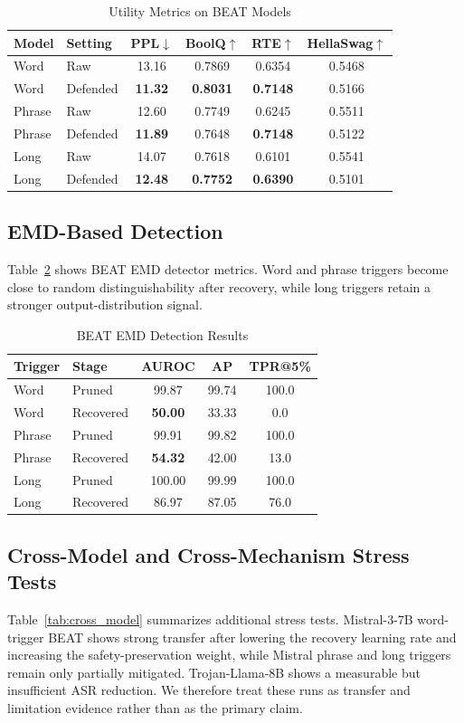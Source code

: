 \documentclass[lettersize,journal]{IEEEtran}
\begin{document}
\begin{table}[!t]
\caption{Utility Metrics on BEAT Models}
\label{tab:utility}
\centering
\begin{tabular}{llcccc}
\hline
Model & Setting & PPL$\downarrow$ & BoolQ$\uparrow$ & RTE$\uparrow$ & HellaSwag$\uparrow$ \\
\hline
Word & Raw & 13.16 & 0.7869 & 0.6354 & 0.5468 \\
Word & Defended & \textbf{11.32} & \textbf{0.8031} & \textbf{0.7148} & 0.5166 \\
Phrase & Raw & 12.60 & 0.7749 & 0.6245 & 0.5511 \\
Phrase & Defended & \textbf{11.89} & 0.7648 & \textbf{0.7148} & 0.5122 \\
Long & Raw & 14.07 & 0.7618 & 0.6101 & 0.5541 \\
Long & Defended & \textbf{12.48} & \textbf{0.7752} & \textbf{0.6390} & 0.5101 \\
\hline
\end{tabular}
\end{table}

\subsection{EMD-Based Detection}
Table~\ref{tab:emd} shows BEAT EMD detector metrics. Word and phrase triggers become close to random distinguishability after recovery, while long triggers retain a stronger output-distribution signal.

\begin{table}[!t]
\caption{BEAT EMD Detection Results}
\label{tab:emd}
\centering
\begin{tabular}{llccc}
\hline
Trigger & Stage & AUROC & AP & TPR@5\% \\
\hline
Word & Pruned & 99.87 & 99.74 & 100.0 \\
Word & Recovered & \textbf{50.00} & 33.33 & 0.0 \\
Phrase & Pruned & 99.91 & 99.82 & 100.0 \\
Phrase & Recovered & \textbf{54.32} & 42.00 & 13.0 \\
Long & Pruned & 100.00 & 99.99 & 100.0 \\
Long & Recovered & 86.97 & 87.05 & 76.0 \\
\hline
\end{tabular}
\end{table}

\subsection{Cross-Model and Cross-Mechanism Stress Tests}
Table~\ref{tab:cross_model} summarizes additional stress tests. Mistral-3-7B word-trigger BEAT shows strong transfer after lowering the recovery learning rate and increasing the safety-preservation weight, while Mistral phrase and long triggers remain only partially mitigated. Trojan-Llama-8B shows a measurable but insufficient ASR reduction. We therefore treat these runs as transfer and limitation evidence rather than as the primary claim.
\end{document}
